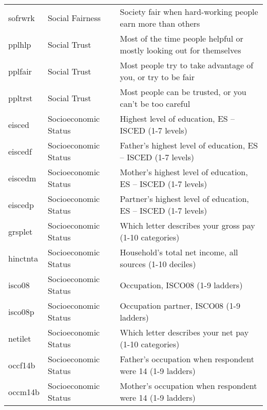 \begin{longtable}{p{1.2cm}p{3.2cm}p{6cm}}
	sofrwrk & Social Fairness & Society fair when hard-working people earn more than others \\
	pplhlp & Social Trust & Most of the time people helpful or mostly looking out for themselves \\
	pplfair & Social Trust & Most people try to take advantage of you, or try to be fair \\
	ppltrst & Social Trust & Most people can be trusted, or you can't be too careful \\
	eisced & Socioeconomic Status & Highest level of education, ES – ISCED (1-7 levels) \\
	eiscedf & Socioeconomic Status & Father's highest level of education, ES – ISCED (1-7 levels) \\
	eiscedm & Socioeconomic Status & Mother's highest level of education, ES – ISCED (1-7 levels) \\
	eiscedp & Socioeconomic Status & Partner's highest level of education, ES – ISCED (1-7 levels) \\
	grsplet & Socioeconomic Status & Which letter describes your gross pay (1-10 categories) \\
	hinctnta & Socioeconomic Status & Household's total net income, all sources (1-10 deciles) \\
	isco08 & Socioeconomic Status & Occupation, ISCO08 (1-9 ladders) \\
	isco08p & Socioeconomic Status & Occupation partner, ISCO08 (1-9 ladders) \\
	netilet & Socioeconomic Status & Which letter describes your net pay (1-10 categories) \\
	occf14b & Socioeconomic Status & Father's occupation when respondent were 14 (1-9 ladders) \\
	occm14b & Socioeconomic Status & Mother's occupation when respondent were 14 (1-9 ladders) \\
\end{longtable}

